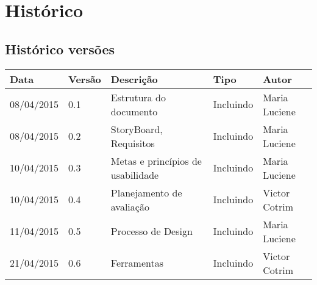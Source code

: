 \chapter[Histórico]{Histórico}

\section{Histórico versões}

\begin{table}[h]
	\centering
	\begin{tabular}{|l|l|l|l|l|}
		\hline
		Data & Versão & Descrição & Tipo & Autor \\ \hline
		08/04/2015 & 0.1 & Estrutura do documento & Incluindo & Maria Luciene \\ \hline
		08/04/2015 & 0.2 & StoryBoard, Requisitos & Incluindo & Maria Luciene \\ \hline
		10/04/2015 & 0.3 & Metas e princípios de usabilidade & Incluindo & Maria Luciene \\ \hline
		10/04/2015 & 0.4 & Planejamento de avaliação & Incluindo & Victor Cotrim \\ \hline
		11/04/2015 & 0.5 & Processo de Design & Incluindo & Maria Luciene \\ \hline	
		21/04/2015 & 0.6 & Ferramentas & Incluindo & Victor Cotrim \\ \hline	
	\end{tabular}
\end{table}
